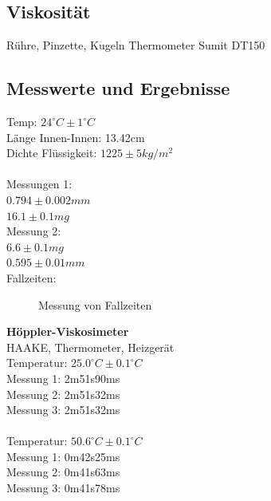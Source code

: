 \documentclass[12pt,a4paper]{article}
\begin{document}
\begin{multicols}{2}
\section{Viskosität}




Rühre, Pinzette, Kugeln
Thermometer Sumit DT150\\
\subsection{Messwerte und Ergebnisse}
Temp: $24^{\circ}C \pm 1^{\circ}C$\\
Länge Innen-Innen: 13.42cm\\
Dichte Flüssigkeit: $1225 \pm 5 kg/m^2$\\
\\
Messungen 1:\\
$0.794 \pm 0.002mm$\\
$16.1 \pm 0.1 mg$\\
Messung 2:\\
$6.6 \pm 0.1mg$\\
$0.595 \pm 0.01mm$\\
Fallzeiten:\\
\begin{figure}[H]
	\centering
	\caption{Messung von Fallzeiten}
	\label{fig:visko_fallzeit}
\end{figure}
\noindent
\textbf{Höppler-Viskosimeter}\\
HAAKE, Thermometer, Heizgerät\\
Temperatur: $25.0^{\circ}C \pm 0.1^{\circ}C$\\
Messung 1: 2m51s90ms\\
Messung 2: 2m51s32ms\\
Messung 3: 2m51s32ms\\
\\
Temperatur: $50.6^{\circ}C \pm 0.1^{\circ}C$\\
Messung 1: 0m42s25ms\\
Messung 2: 0m41s63ms\\
Messung 3: 0m41s78ms\\
\\

\end{multicols}
\end{document}
